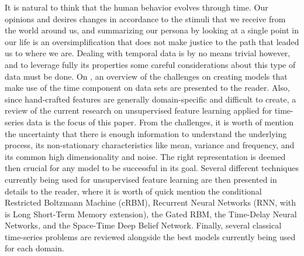 \documentclass{kththesis}
\begin{document}
It is natural to think that the human behavior evolves through time. Our opinions and desires changes in accordance to the stimuli that we receive from the world around us, and summarizing our persona by looking at a single point in our life is an oversimplification that does not make justice to the path that leaded us to where we are. Dealing with temporal data is by no means trivial however, and to leverage fully its properties some careful considerations about this type of data must be done. On \citep{Langkvist2014}, an overview of the challenges on creating models that make use of the time component on data sets are presented to the reader. Also, since hand-crafted features are generally domain-specific and difficult to create, a review of the current research on unsupervised feature learning applied for time-series data is the focus of this paper. From the challenges, it is worth of mention the uncertainty that there is enough information to understand the underlying process, its non-stationary characteristics like mean, variance and frequency, and its common high dimensionality and noise. The right representation is deemed then crucial for any model to be successful in its goal. Several different techniques currently being used for unsupervised feature learning are then presented in details to the reader, where it is worth of quick mention the conditional Restricted Boltzmann Machine (cRBM), Recurrent Neural Networks (RNN, with is Long Short-Term Memory extension), the Gated RBM, the Time-Delay Neural Networks, and the Space-Time Deep Belief Network. Finally, several classical time-series problems are reviewed alongside the best models currently being used for each domain. 
\end{document}
